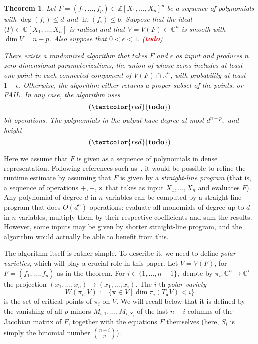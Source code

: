 \documentclass[12pt]{article}
\def\xb{{\bm x}}
\DeclareMathOperator{\htt}{ht}
\newcommand{\ZZ}{{\mathbb{Z}}}
\def\C{\mathbb{C}}
\def\R{\mathbb{R}}
\def\td{(\textcolor{red}{{\bf todo}})}
\newtheorem{theorem}{Theorem}[section]
\begin{document}
\begin{theorem}\label{theo:main}
  Let $F= (f_1,\hdots,f_p)\in\ZZ[X_1,\hdots,X_n]^p$ be a sequence of
  polynomials with $\deg(f_i) \leq d$ and $\htt(f_i) \leq b$. Suppose
  that the ideal $\langle F \rangle \subset \C[X_1,\hdots,X_n]$ is
  radical and that $V=V(F) \subset \C^n$ is smooth with $\dim V =
  n-p$. Also suppose that $0 < \epsilon < 1.$ \td

  There exists a randomized algorithm that takes $F$ and $\epsilon$ as
  input and produces $n$ zero-dimensional parameterizations, the union
  of whose zeros includes at least one point in each connected
  component of $V(F) \cap \R^n$, with probability at least
  $1-\epsilon$. Otherwise, the algorithm either returns a proper
  subset of the points, or FAIL.  In any case, the algorithm uses
  \[
  \td
  \]
  bit operations. The polynomials in the output have degree at most
  $d^{n+p},$ and height
  \[
  \td
  \]
\end{theorem}

Here we assume that $F$ is given as a sequence of polynomials in dense
representation.  Following references such
as~\cite{GiHeMoPa95,GiHaHeMoMoPa97,GiHeMoMoPa98,BaGiHeMb97,EMP}, it
would be possible to refine the runtime estimate by assuming that $F$
is given by a {\em straight-line program} (that is, a sequence of
operations $+,-,\times$ that takes as input $X_1,\dots,X_n$ and
evaluates $F$). Any polynomial of degree $d$ in $n$ variables can be
computed by a straight-line program that does $O(d^n)$ operations:
evaluate all monomials of degree up to $d$ in $n$ variables, multiply
them by their respective coefficients and sum the results. However,
some inputs may be given by shorter straight-line program, and the
algorithm would actually be able to benefit from this.

The algorithm itself is rather simple. To describe it, we need to
define {\em polar varieties}, which will play a crucial role in this
paper. Let $V=V(F)$, for $F=(f_1,\dots,f_p)$ as in the theorem. For $i
\in \{1,\hdots,n-1\},$ denote by $\pi_i:\C^n \rightarrow \C^i$ the
projection $(x_1,\hdots,x_n) \mapsto (x_1,\hdots,x_i)$.  The $i$-th
\textit{polar variety} \[W(\pi_i,V) := \{\xb \in V~|~\dim \pi_i(T_\xb
V) < i\}\] is the set of critical points of $\pi_i$ on $V$.  We will
recall below that it is defined by the vanishing of all $p$-minors
$M_{i,1},\dots,M_{i,S_i}$ of the last $n-i$ columns of the Jacobian
matrix of $F$, together with the equations $F$ themselves (here, $S_i$
is simply the binomial number $\binom{n-i}{p}$).
\end{document}
